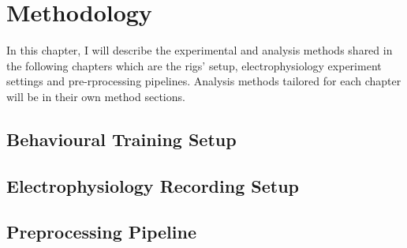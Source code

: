 \chapter{Methodology}
\label{chapterlabel2}

In this chapter, I will describe the experimental and analysis methods shared in the following chapters which are the rigs' setup, electrophysiology experiment settings and pre-rprocessing pipelines. Analysis methods tailored for each chapter will be in their own method sections. 

\section{Behavioural Training Setup}


\section{Electrophysiology Recording Setup}

\section{Preprocessing Pipeline}
\blindtext
